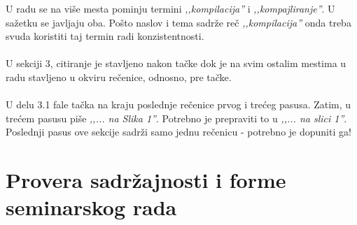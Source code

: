 \documentclass[a4paper]{report}
\begin{document}
\noindent U radu se na više mesta pominju termini \textit{‚‚kompilacija''} i \textit{‚‚kompajliranje''}. U sažetku se javljaju oba. Pošto naslov i tema sadrže reč \textit{‚‚kompilacija''} onda treba svuda koristiti taj termin radi konzistentnosti.
\\
\\
U sekciji 3, citiranje je stavljeno nakon tačke dok je na svim ostalim mestima u radu stavljeno u okviru rečenice, odnosno, pre tačke.
\\
\\
U delu 3.1 fale tačka na kraju poslednje rečenice prvog i trećeg pasusa. Zatim, u trećem pasusu piše \textit{‚‚... na Slika 1''}. Potrebno je prepraviti to u \textit{‚‚... na slici 1''}. Poslednji pasus ove sekcije sadrži samo jednu rečenicu - potrebno je dopuniti ga!


\section{Provera sadržajnosti i forme seminarskog rada}
\end{document}
